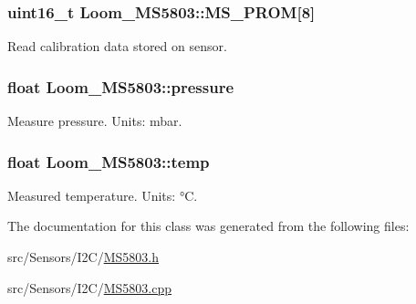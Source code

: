 \subsubsection[{\texorpdfstring{M\+S\+\_\+\+P\+R\+OM}{MS_PROM}}]{\setlength{\rightskip}{0pt plus 5cm}uint16\+\_\+t Loom\+\_\+\+M\+S5803\+::\+M\+S\+\_\+\+P\+R\+OM\mbox{[}8\mbox{]}\hspace{0.3cm}{\ttfamily [protected]}}\hypertarget{class_loom___m_s5803_aef9ff121171d7b27f369a60495666ab7}{}\label{class_loom___m_s5803_aef9ff121171d7b27f369a60495666ab7}


Read calibration data stored on sensor. 

\subsubsection[{\texorpdfstring{pressure}{pressure}}]{\setlength{\rightskip}{0pt plus 5cm}float Loom\+\_\+\+M\+S5803\+::pressure\hspace{0.3cm}{\ttfamily [protected]}}\hypertarget{class_loom___m_s5803_afe0623825dcab69c7f204e32b0fcab56}{}\label{class_loom___m_s5803_afe0623825dcab69c7f204e32b0fcab56}


Measure pressure. Units\+: mbar. 

\subsubsection[{\texorpdfstring{temp}{temp}}]{\setlength{\rightskip}{0pt plus 5cm}float Loom\+\_\+\+M\+S5803\+::temp\hspace{0.3cm}{\ttfamily [protected]}}\hypertarget{class_loom___m_s5803_a12df20babc5ac276523664c7d6607810}{}\label{class_loom___m_s5803_a12df20babc5ac276523664c7d6607810}


Measured temperature. Units\+: °C. 



The documentation for this class was generated from the following files\+:\begin{DoxyCompactItemize}
\item 
src/\+Sensors/\+I2\+C/\hyperlink{_m_s5803_8h}{M\+S5803.\+h}\item 
src/\+Sensors/\+I2\+C/\hyperlink{_m_s5803_8cpp}{M\+S5803.\+cpp}\end{DoxyCompactItemize}
